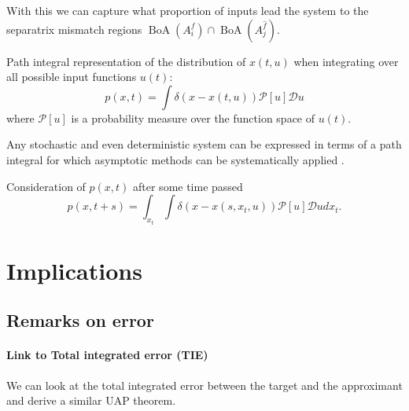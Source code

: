 \documentclass{article}
\newcommand{\boa}{\operatorname{BoA}}
\newcounter{ct}
\begin{document}
With this we can capture what proportion of inputs lead the system to the separatrix mismatch regions $\boa(A_i^f)\cap\boa(A_j^{\hat{f}})$. %



Path integral representation of the distribution of $x(t,u)$ when integrating over all possible input functions $u(t)$:
\begin{equation}
    p(x,t) = \int \delta(x - x(t, u)) \mathcal{P}[u] \mathcal{D}u
\end{equation}
where $\mathcal{P}[u]$ is a probability measure over the function space of $u(t)$.

Any stochastic and even deterministic system can be expressed in terms of a path integral for which asymptotic methods can be systematically applied  \citep{chow2015path}.


Consideration of $p(x,t)$ after some time passed %
\begin{equation}
    p(x,t+s) = \int_{x_t} \int \delta(x - x(s, x_t, u)) \mathcal{P}[u] \mathcal{D}u dx_t.
\end{equation}









\newpage
\section{Implications}

\subsection{Remarks on error}\label{sec:error_remarks}
\paragraph{Link to Total integrated error (TIE)}
We can look at the total integrated error between the target and the approximant and derive a similar UAP theorem.
\end{document}
